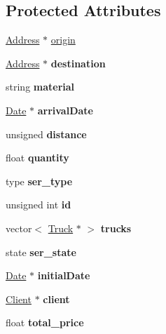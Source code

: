 \subsection*{Protected Attributes}
\begin{DoxyCompactItemize}
\item 
\hyperlink{class_address}{Address} $\ast$ \hyperlink{class_service_a4abd0a104d97e5bdb8e8ca93bab31ce7}{origin}
\item 
\mbox{\label{class_service_adf346b71b98618cf84e5d0a0eca2ee1e}} 
\hyperlink{class_address}{Address} $\ast$ {\bfseries destination}
\item 
\mbox{\label{class_service_a04a4efb2434d7c4acb7c43bfef2d9c52}} 
string {\bfseries material}
\item 
\mbox{\label{class_service_a1e1bdf965c61c9d52c6992beb5594032}} 
\hyperlink{class_date}{Date} $\ast$ {\bfseries arrival\+Date}
\item 
\mbox{\label{class_service_ad183cae7d3eeb78860669d209f4e7387}} 
unsigned {\bfseries distance}
\item 
\mbox{\label{class_service_afef38ab183af6a2b6fba08400c9eb987}} 
float {\bfseries quantity}
\item 
\mbox{\label{class_service_acb458e8692722cfba06273fb938c2bf8}} 
type {\bfseries ser\+\_\+type}
\item 
\mbox{\label{class_service_adae62762a30190e27f24e40c7dbebae5}} 
unsigned int {\bfseries id}
\item 
\mbox{\label{class_service_a179356d0a67dfff27fb9417db0c9357b}} 
vector$<$ \hyperlink{class_truck}{Truck} $\ast$ $>$ {\bfseries trucks}
\item 
\mbox{\label{class_service_ae0321f4e4847e9e413910831262c89c4}} 
state {\bfseries ser\+\_\+state}
\item 
\mbox{\label{class_service_a16f7facc8c1f9dd5ad1a58750e20aea1}} 
\hyperlink{class_date}{Date} $\ast$ {\bfseries initial\+Date}
\item 
\mbox{\label{class_service_ac7249f01861124261b7b4b23bb27ab3e}} 
\hyperlink{class_client}{Client} $\ast$ {\bfseries client}
\item 
\mbox{\label{class_service_a9aad689e8f65b495425fda35cf5662ed}} 
float {\bfseries total\+\_\+price}
\end{DoxyCompactItemize}
